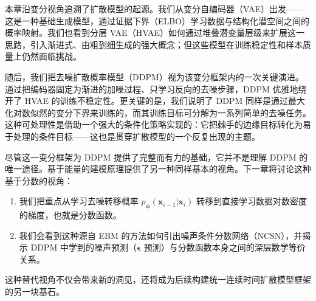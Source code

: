 本章沿变分视角追溯了扩散模型的起源。我们从变分自编码器（VAE）出发——这是一种基础生成模型，通过证据下界（ELBO）学习数据与结构化潜空间之间的概率映射。我们也看到分层 VAE（HVAE）如何通过堆叠潜变量层级来扩展这一思路，引入渐进式、由粗到细生成的强大概念；但这些模型在训练稳定性和样本质量上仍然面临挑战。

随后，我们把去噪扩散概率模型（DDPM）视为该变分框架内的一次关键演进。通过把编码器固定为渐进的加噪过程、只学习反向的去噪步骤，DDPM 优雅地绕开了 HVAE 的训练不稳定性。更关键的是，我们说明了 DDPM 同样是通过最大化对数似然的变分下界来训练的，而其训练目标可分解为一系列简单的去噪任务。这种可处理性是借助一个强大的条件化策略实现的：它把棘手的边缘目标转化为易于处理的条件目标——这也是贯穿扩散模型的一个反复出现的主题。


尽管这一变分框架为 DDPM 提供了完整而有力的基础，它并不是理解 DDPM 的唯一途径。基于能量的建模原理提供了另一种同样基本的视角。下一章将讨论这种基于分数的视角：
\begin{enumerate}
    \item 我们把重点从学习去噪转移概率 $p_{\bm{\phi}}(\mathbf{x}_{i-1}\vert\mathbf{x}_{i})$ 转移到直接学习数据对数密度的梯度，也就是分数函数。
    \item 我们会看到这种源自 EBM 的方法如何引出噪声条件分数网络（NCSN），并揭示 DDPM 中学到的噪声预测（$\bm{\epsilon}$ 预测）与分数函数本身之间的深层数学等价关系。
\end{enumerate}

这种替代视角不仅会带来新的洞见，还将成为后续构建统一连续时间扩散模型框架的另一块基石。
